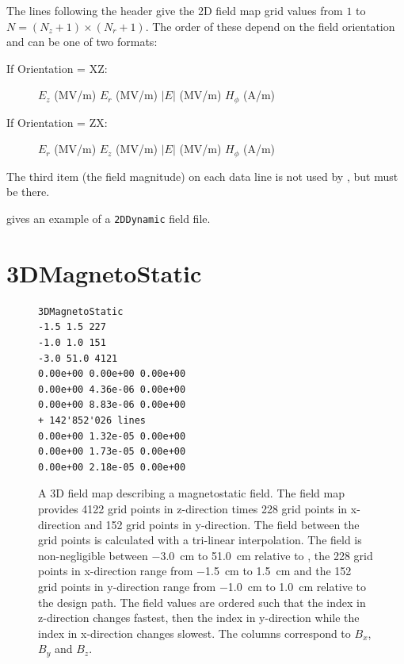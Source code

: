 The lines following the header give the 2D field map grid values from $1$ to $N= (N_{z} + 1) \times (N_{r} + 1)$. The
order of these depend on the field orientation  and can be one of two formats:
\begin{description}
\item[If Orientation = XZ:] $E_{z}$ (MV/m) $E_{r}$ (MV/m) $|E|$ (MV/m) $H_{\phi}$ (A/m)
\item[If Orientation = ZX:] $E_{r}$ (MV/m) $E_{z}$ (MV/m) $|E|$ (MV/m) $H_{\phi}$ (A/m)
\end{description}
The third item (the field magnitude) on each data line is not used by \opalt, but must be there.

 gives an example of a \texttt{2DDynamic} field file.
\clearpage
\section{3DMagnetoStatic}
\label{sec:3DMagnetoStatic}
\begin{figure}[h]
  \begin{fmpage}
\begin{verbatim}
3DMagnetoStatic
-1.5 1.5 227
-1.0 1.0 151
-3.0 51.0 4121
0.00e+00 0.00e+00 0.00e+00
0.00e+00 4.36e-06 0.00e+00
0.00e+00 8.83e-06 0.00e+00
+ 142'852'026 lines
0.00e+00 1.32e-05 0.00e+00
0.00e+00 1.73e-05 0.00e+00
0.00e+00 2.18e-05 0.00e+00
\end{verbatim}
  \end{fmpage}
  \caption[Example of a 3DMagnetoStatic field map]{A 3D field map describing a magnetostatic field.
    The field map provides 4122 grid points in z-direction times 228 grid points in x-direction and 152 grid points in y-direction.
    The field between the grid points is calculated with a tri-linear interpolation. The field is non-negligible between \SI{-3.0}{\centi\meter}
    to \SI{51.0}{\centi\meter} relative to , the 228 grid points in x-direction range from \SI{-1.5}{\centi\meter} to \SI{1.5}{\centi\meter} and the 152 grid
    points in y-direction range from \SI{-1.0}{\centi\meter} to \SI{1.0}{\centi\meter} relative to the design path. The field values are ordered such that the index in z-direction changes fastest, then the index in y-direction while the index in x-direction changes
    slowest. The columns correspond to $B_x$, $B_y$ and $B_z$.}
  \label{fig:3DMagnetoStatic}
\end{figure}

